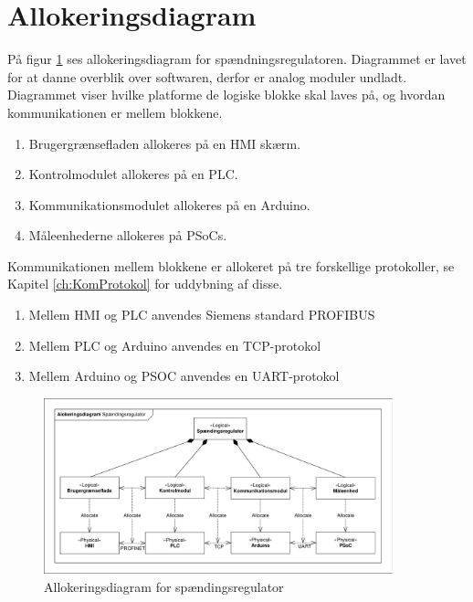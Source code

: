 
\section{Allokeringsdiagram}
På figur \ref{fig:Allokering} ses allokeringsdiagram for spændningsregulatoren. Diagrammet er lavet for at danne overblik over softwaren, derfor er analog moduler undladt. Diagrammet viser hvilke platforme de logiske blokke skal laves på, og hvordan kommunikationen er mellem blokkene.

\begin{enumerate}
	\item Brugergrænsefladen allokeres på en HMI skærm.
	\item Kontrolmodulet allokeres på en PLC.
	\item Kommunikationsmodulet allokeres på en Arduino.
	\item Måleenhederne allokeres på PSoCs.
\end{enumerate}   
Kommunikationen mellem blokkene er allokeret på tre forskellige protokoller, se Kapitel \ref{ch:KomProtokol} for uddybning af disse.
\begin{enumerate}
	\item Mellem HMI og PLC anvendes Siemens standard PROFIBUS
	\item Mellem PLC og Arduino anvendes en TCP-protokol
	\item Mellem Arduino og PSOC anvendes en UART-protokol
\end{enumerate}

\begin{figure}[htbp] %
	\centering
	\includegraphics[width=0.9\textwidth]{Figure/Allokering}
	\caption{Allokeringsdiagram for spændingsregulator}
	\label{fig:Allokering}
\end{figure}

\newpage